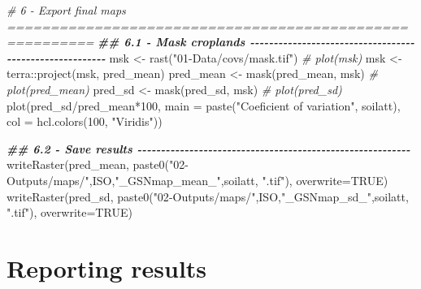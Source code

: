 \documentclass[
  10pt,
  b5paper,
  oneside]{book}
\newenvironment{Shaded}{\begin{snugshade}}{\end{snugshade}}
\newcommand{\AttributeTok}[1]{\textcolor[rgb]{0.77,0.63,0.00}{#1}}
\newcommand{\CommentTok}[1]{\textcolor[rgb]{0.56,0.35,0.01}{\textit{#1}}}
\newcommand{\ConstantTok}[1]{\textcolor[rgb]{0.00,0.00,0.00}{#1}}
\newcommand{\DecValTok}[1]{\textcolor[rgb]{0.00,0.00,0.81}{#1}}
\newcommand{\DocumentationTok}[1]{\textcolor[rgb]{0.56,0.35,0.01}{\textbf{\textit{#1}}}}
\newcommand{\FunctionTok}[1]{\textcolor[rgb]{0.00,0.00,0.00}{#1}}
\newcommand{\NormalTok}[1]{#1}
\newcommand{\OtherTok}[1]{\textcolor[rgb]{0.56,0.35,0.01}{#1}}
\newcommand{\SpecialCharTok}[1]{\textcolor[rgb]{0.00,0.00,0.00}{#1}}
\newcommand{\StringTok}[1]{\textcolor[rgb]{0.31,0.60,0.02}{#1}}
\begin{document}
\begin{Shaded}
\begin{Highlighting}[]
  \CommentTok{\# 6 {-} Export final maps ========================================================}
  \DocumentationTok{\#\# 6.1 {-} Mask croplands {-}{-}{-}{-}{-}{-}{-}{-}{-}{-}{-}{-}{-}{-}{-}{-}{-}{-}{-}{-}{-}{-}{-}{-}{-}{-}{-}{-}{-}{-}{-}{-}{-}{-}{-}{-}{-}{-}{-}{-}{-}{-}{-}{-}{-}{-}{-}{-}{-}{-}{-}{-}{-}{-}{-}{-}}
\NormalTok{  msk }\OtherTok{\textless{}{-}} \FunctionTok{rast}\NormalTok{(}\StringTok{"01{-}Data/covs/mask.tif"}\NormalTok{)}
  \CommentTok{\# plot(msk)}
\NormalTok{  msk }\OtherTok{\textless{}{-}}\NormalTok{ terra}\SpecialCharTok{::}\FunctionTok{project}\NormalTok{(msk, pred\_mean)}
\NormalTok{  pred\_mean }\OtherTok{\textless{}{-}} \FunctionTok{mask}\NormalTok{(pred\_mean, msk)}
  \CommentTok{\# plot(pred\_mean)}
\NormalTok{  pred\_sd }\OtherTok{\textless{}{-}} \FunctionTok{mask}\NormalTok{(pred\_sd, msk)}
  \CommentTok{\# plot(pred\_sd)}
  \FunctionTok{plot}\NormalTok{(pred\_sd}\SpecialCharTok{/}\NormalTok{pred\_mean}\SpecialCharTok{*}\DecValTok{100}\NormalTok{, }\AttributeTok{main =} \FunctionTok{paste}\NormalTok{(}\StringTok{"Coeficient of variation"}\NormalTok{, soilatt), }
       \AttributeTok{col =} \FunctionTok{hcl.colors}\NormalTok{(}\DecValTok{100}\NormalTok{, }\StringTok{"Viridis"}\NormalTok{))}
  
  \DocumentationTok{\#\# 6.2 {-} Save results {-}{-}{-}{-}{-}{-}{-}{-}{-}{-}{-}{-}{-}{-}{-}{-}{-}{-}{-}{-}{-}{-}{-}{-}{-}{-}{-}{-}{-}{-}{-}{-}{-}{-}{-}{-}{-}{-}{-}{-}{-}{-}{-}{-}{-}{-}{-}{-}{-}{-}{-}{-}{-}{-}{-}{-}{-}{-}}
  \FunctionTok{writeRaster}\NormalTok{(pred\_mean, }
              \FunctionTok{paste0}\NormalTok{(}\StringTok{"02{-}Outputs/maps/"}\NormalTok{,ISO,}\StringTok{"\_GSNmap\_mean\_"}\NormalTok{,soilatt, }\StringTok{".tif"}\NormalTok{),}
              \AttributeTok{overwrite=}\ConstantTok{TRUE}\NormalTok{)}
  \FunctionTok{writeRaster}\NormalTok{(pred\_sd, }
              \FunctionTok{paste0}\NormalTok{(}\StringTok{"02{-}Outputs/maps/"}\NormalTok{,ISO,}\StringTok{"\_GSNmap\_sd\_"}\NormalTok{,soilatt, }\StringTok{".tif"}\NormalTok{),}
              \AttributeTok{overwrite=}\ConstantTok{TRUE}\NormalTok{)}
\end{Highlighting}
\end{Shaded}

\hypertarget{reporting-results}{%
\chapter{Reporting results}\label{reporting-results}}
\end{document}
